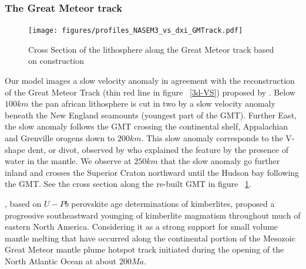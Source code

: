 \documentclass[12pt]{article}
\begin{document}


\subsubsection{The Great Meteor track}
	\begin{figure}
		\centerline{\texttt{[image: figures/profiles\_NASEM3\_vs\_dxi\_GMTrack.pdf]}}

		\caption{Cross Section of the lithosphere along the Great Meteor track based on \cite{heaman2000timing} construction}
		\label{gmtcross}

	\end{figure}

	Our model images a slow velocity anomaly in agreement with the reconstruction of the Great Meteor Track (thin red line in figure ~\ref{3d-VS}) proposed by \cite{heaman2000timing}.
	Below $100km$ the pan african lithosphere is cut in two by a slow velocity anomaly beneath the New England seamounts (youngest part of the GMT). Further East, the slow anomaly follows the GMT crossing the continental shelf, Appalachian and Grenville orogens down to $200km$. 
	This slow anomaly corresponds to the V-shape dent, or divot, observed by \cite{lee1997upper} who explained the feature by the presence of water in the mantle. 
	We observe at $250km$ that the slow anomaly go further inland and crosses the Superior Craton northward until the Hudson bay following the GMT.
	See the cross section along the re-built GMT in figure ~\ref{gmtcross}.

	\cite{heaman2000timing}, based on $U-Pb$ perovskite age determinations of kimberlites, proposed a progressive southeastward younging of kimberlite magmatism throughout much of eastern North America. Considering it as a strong support for small volume mantle melting that have occurred along the continental portion of the Mesozoic Great Meteor mantle plume hotspot track initiated during the opening of the North Atlantic Ocean at about $200Ma$. \citep[See figure 4. in][]{heaman2000timing}
\end{document}
